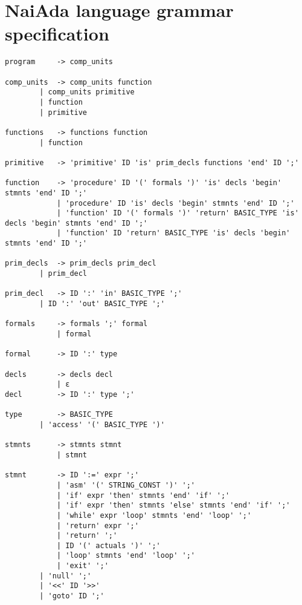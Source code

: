 \label{appendix}
\section{NaiAda language grammar specification}\label{sec:grammar}
\noindent
\begin{lstlisting}
program     -> comp_units 									        

comp_units  -> comp_units function					
	    | comp_units primitive						
	    | function									
	    | primitive

functions   -> functions function
	    | function		

primitive   -> 'primitive' ID 'is' prim_decls functions 'end' ID ';'	

function    -> 'procedure' ID '(' formals ')' 'is' decls 'begin' stmnts 'end' ID ';'	
            | 'procedure' ID 'is' decls 'begin' stmnts 'end' ID ';' 	
            | 'function' ID '(' formals ')' 'return' BASIC_TYPE 'is' decls 'begin' stmnts 'end' ID ';'
            | 'function' ID 'return' BASIC_TYPE 'is' decls 'begin' stmnts 'end' ID ';'

prim_decls  -> prim_decls prim_decl
	    | prim_decl		

prim_decl   -> ID ':' 'in' BASIC_TYPE ';'	
	    | ID ':' 'out' BASIC_TYPE ';'	

formals     -> formals ';' formal
            | formal	

formal      -> ID ':' type

decls       -> decls decl
            | ε										
decl        -> ID ':' type ';' 

type	    -> BASIC_TYPE
	    | 'access' '(' BASIC_TYPE ')'	

stmnts      -> stmnts stmnt
            | stmnt	

stmnt       -> ID ':=' expr ';'     
            | 'asm' '(' STRING_CONST ')' ';' 
            | 'if' expr 'then' stmnts 'end' 'if' ';' 	
            | 'if' expr 'then' stmnts 'else' stmnts 'end' 'if' ';'
            | 'while' expr 'loop' stmnts 'end' 'loop' ';'	
            | 'return' expr ';'                    
            | 'return' ';'                       	
            | ID '(' actuals ')' ';'        
            | 'loop' stmnts 'end' 'loop' ';'        
            | 'exit' ';'    		    
	    | 'null' ';'			
	    | '<<' ID '>>'			
	    | 'goto' ID ';'			


\end{lstlisting}
